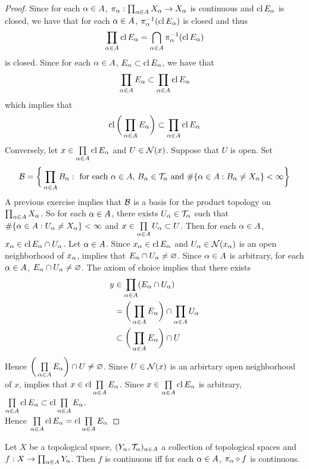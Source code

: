 \documentclass{book}
\begin{document}
	\begin{proof}
		Since for each $\alpha \in A$, $\pi_{\alpha}: \prod_{\alpha \in A}X_{\alpha} \rightarrow X_{\alpha}$ is continuous and $\operatorname{cl} E_{\alpha}$ is closed, we have that for each $\alpha \in A$, $ \pi_{\alpha}^{-1}(\operatorname{cl} E_{\alpha})$ is closed and thus 
		$$\prod_{\alpha \in A} \operatorname{cl} E_{\alpha} = \bigcap_{\alpha \in A} \pi_{\alpha}^{-1}(\operatorname{cl} E_{\alpha})$$
		is closed. Since for each $\alpha \in A$, $E_{\alpha} \subset \operatorname{cl} E_{\alpha}$, we have that 
		$$ \prod_{\alpha \in A}  E_{\alpha}  \subset \prod_{\alpha \in A} \operatorname{cl} E_{\alpha}$$ 
		which implies that 
		$$ \operatorname{cl} \bigg( \prod_{\alpha \in A}  E_{\alpha} \bigg)  \subset \prod_{\alpha \in A} \operatorname{cl} E_{\alpha}$$ 
		Conversely, let $x \in \prod\limits_{\alpha \in A} \operatorname{cl} E_{\alpha}$ and $U \in \mathcal{N}(x)$. Suppose that $U$ is open. Set 
		$$\mathcal{B} = \bigg \{\prod_{\alpha \in A}B_{\alpha}: \text{ for each $\alpha \in A$,  $B_{\alpha} \in \mathcal{T}_{\alpha}$ and $\# \{\alpha \in A: B_{\alpha} \neq X_{\alpha}\} < \infty$} \bigg\}$$
		A previous exercise implies that $\mathcal{B}$ is a basis for the product topology on $\prod_{\alpha \in A}X_{\alpha}$. So for each $\alpha \in A$, there exists $U_{\alpha} \in \mathcal{T}_{\alpha}$ such that $\# \{\alpha \in A: U_{\alpha} \neq X_{\alpha}\} < \infty$ and $x \in \prod\limits_{\alpha \in A} U_{\alpha} \subset U$. Then for each $\alpha \in A$, $x_{\alpha} \in \operatorname{cl} E_{\alpha} \cap U_{\alpha}$. Let $\alpha \in A$. Since $x_{\alpha} \in \operatorname{cl} E_{\alpha}$ and $U_{\alpha} \in \mathcal{N}(x_{\alpha})$ is an open neighborhood of $x_{\alpha}$,  implies that $E_{\alpha} \cap U_{\alpha} \neq \varnothing$. Since $\alpha \in A$ is arbitrary, for each $\alpha \in A$, $E_{\alpha} \cap U_{\alpha} \neq \varnothing$. The axiom of choice implies that there exists
		\begin{align*}
			y 
			& \in \prod\limits_{\alpha \in A}  (E_{\alpha} \cap U_{\alpha} ) \\
			& = \bigg( \prod\limits_{\alpha \in A} E_{\alpha} \bigg) \cap \prod_{\alpha \in A} U_{\alpha} \\
			& \subset \bigg( \prod\limits_{\alpha \in A} E_{\alpha} \bigg) \cap U
		\end{align*}
		Hence $\bigg( \prod\limits_{\alpha \in A} E_{\alpha} \bigg) \cap U \neq \varnothing$. Since $U \in \mathcal{N}(x)$ is an arbirtary open neighborhood of $x$,  implies that $x \in \operatorname{cl} \prod\limits_{\alpha \in A} E_{\alpha}$. Since $x \in \prod\limits_{\alpha \in A} \operatorname{cl} E_{\alpha}$ is arbitrary, $\prod\limits_{\alpha \in A} \operatorname{cl} E_{\alpha} \subset  \operatorname{cl} \prod\limits_{\alpha \in A} E_{\alpha}$. \\
		Hence $\prod\limits_{\alpha \in A} \operatorname{cl} E_{\alpha} = \operatorname{cl} \prod\limits_{\alpha \in A} E_{\alpha}$
	\end{proof}
	
	\begin{ex}
		Let $X$ be a topological space, $(Y_{\alpha}, \mathcal{T}_{\alpha})_{\alpha \in A}$ a collection of topological spaces and $f: X \rightarrow \prod_{\alpha \in A}Y_{\alpha}$. Then $f$ is continuous iff for each $\alpha \in A$, $\pi_{\alpha} \circ f$ is continuous.
	\end{ex}
\end{document}
